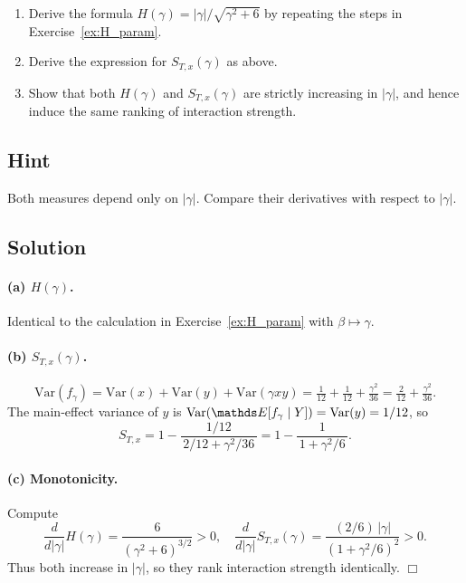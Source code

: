 \documentclass[a4paper]{article}
\begin{document}
\begin{enumerate}%
  \item Derive the formula $H(\gamma)=|\gamma|/\sqrt{\gamma^2+6}$ by
        repeating the steps in Exercise~\ref{ex:H_param}.
  \item Derive the expression for $S_{T,x}(\gamma)$ as above.
  \item Show that both $H(\gamma)$ and $S_{T,x}(\gamma)$ are strictly
        increasing in $|\gamma|$, and hence induce the same ranking of
        interaction strength.
\end{enumerate}

\subsection*{Hint}
Both measures depend only on $|\gamma|$.  Compare their derivatives
with respect to $|\gamma|$.

\subsection*{Solution}

\paragraph{(a) $H(\gamma)$.}
Identical to the calculation in Exercise~\ref{ex:H_param} with
$\beta\mapsto\gamma$.

\paragraph{(b) $S_{T,x}(\gamma)$.}
\[
\text{Var}(f_\gamma)
= \text{Var}(x)+\text{Var}(y)+\text{Var}(\gamma xy)
= \tfrac1{12}+\tfrac1{12}+\tfrac{\gamma^2}{36}
= \tfrac{2}{12} + \tfrac{\gamma^2}{36}.
\]
The main‐effect variance of $y$ is $\text{Var}(\E[f_\gamma\mid Y])=\text{Var}(y)=1/12$, so
\[
S_{T,x} = 1 - \frac{1/12}{\,2/12 + \gamma^2/36\,}
= 1 - \frac{1}{\,1 + \gamma^2/6\,}.
\]

\paragraph{(c) Monotonicity.}
Compute
\[
\frac{d}{d|\gamma|}H(\gamma)
= \frac{6}{(\gamma^2+6)^{3/2}}>0,
\quad
\frac{d}{d|\gamma|}S_{T,x}(\gamma)
= \frac{(2/6)\,|\gamma|}{(1+\gamma^2/6)^2}>0.
\]
Thus both increase in $|\gamma|$, so they rank interaction strength
identically.  \hfill\(\Box\)
\end{document}
